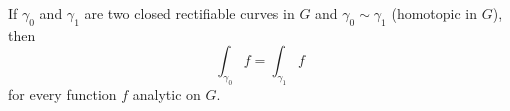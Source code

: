 If $\gamma_0$ and $\gamma_1$ are two closed rectifiable curves in $G$ and $\gamma_0 \sim \gamma_1$ (homotopic in $G$), then
$$
\int_{\gamma_0} f = \int_{\gamma_1} f
$$
for every function $f$ analytic on $G$.
